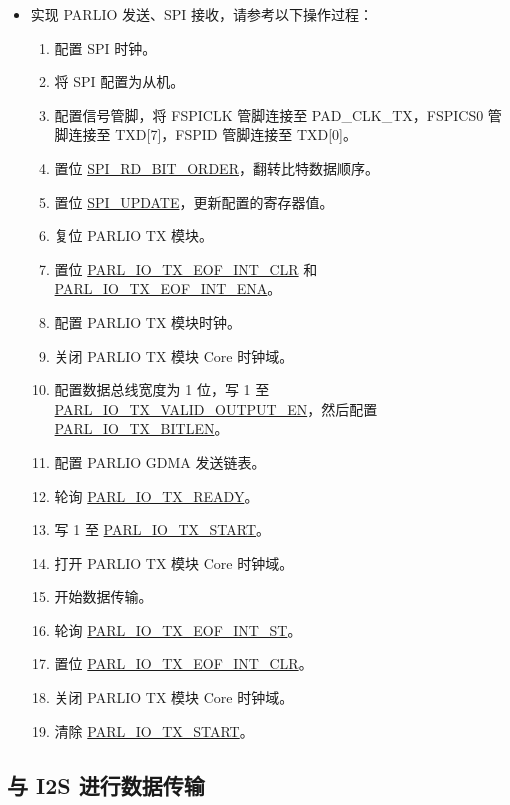 \documentclass[main\_\_CN.tex]{subfiles}
\begin{document}
\begin{itemize}
\begin{enumerate}
    \end{enumerate} 
    \item 实现 PARLIO 发送、SPI 接收，请参考以下操作过程：
    \begin{enumerate}
        \item 配置 SPI 时钟。
        \item 将 SPI 配置为从机。
        \item 配置信号管脚，将 FSPICLK 管脚连接至 PAD\_CLK\_TX，FSPICS0 管脚连接至 TXD[7]，FSPID 管脚连接至 TXD[0]。
        \item 置位 \hyperref[fielddesc:SPIRDBITORDER]{SPI\_RD\_BIT\_ORDER}，翻转比特数据顺序。
        \item 置位 \hyperref[fielddesc:SPIUPDATE]{SPI\_UPDATE}，更新配置的寄存器值。  
        \item 复位 PARLIO TX 模块。
        \item 置位 \hyperref[fielddesc:PARLIOTXEOFINTCLR]{PARL\_IO\_TX\_EOF\_INT\_CLR} 和 \hyperref[fielddesc:PARLIOTXEOFINTENA]{PARL\_IO\_TX\_EOF\_INT\_ENA}。
        \item 配置 PARLIO TX 模块时钟。
        \item 关闭 PARLIO TX 模块 Core 时钟域。
        \item 配置数据总线宽度为 1 位，写 1 至 \hyperref[fielddesc:PARLIOTXVALIDOUTPUTEN]{PARL\_IO\_TX\_VALID\_OUTPUT\_EN}，然后配置 \hyperref[fielddesc:PARLIOTXBITLEN]{PARL\_IO\_TX\_BITLEN}。
        \item 配置 PARLIO GDMA 发送链表。
        \item 轮询 \hyperref[fielddesc:PARLIOTXREADY]{PARL\_IO\_TX\_READY}。        
        \item 写 1 至 \hyperref[fielddesc:PARLIOTXSTART]{PARL\_IO\_TX\_START}。
        \item 打开 PARLIO TX 模块 Core 时钟域。
        \item 开始数据传输。
        \item 轮询 \hyperref[fielddesc:PARLIOTXEOFINTST]{PARL\_IO\_TX\_EOF\_INT\_ST}。
        \item 置位 \hyperref[fielddesc:PARLIOTXEOFINTCLR]{PARL\_IO\_TX\_EOF\_INT\_CLR}。
        \item 关闭 PARLIO TX 模块 Core 时钟域。
        \item 清除 \hyperref[fielddesc:PARLIOTXSTART]{PARL\_IO\_TX\_START}。  
    \end{enumerate} 
\end{itemize}

\subsection{与 I2S 进行数据传输}
\end{document}
